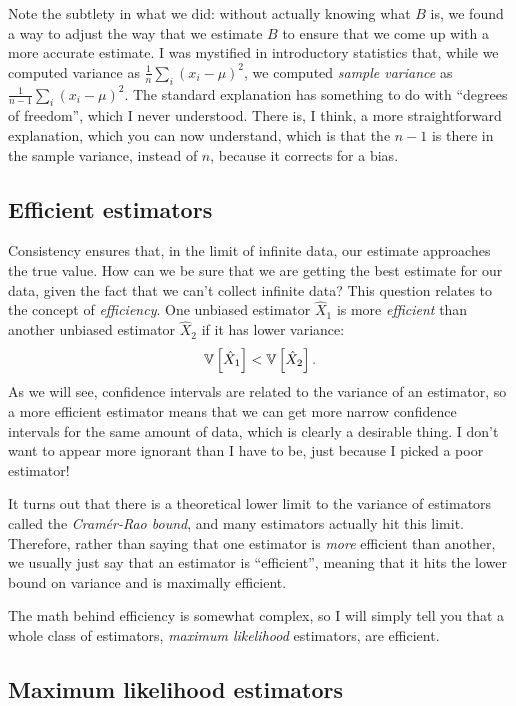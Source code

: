 Note the subtlety in what we did: without actually knowing what $B$ is, we found
a way to adjust the way that we estimate $B$ to ensure that we come up with a more
accurate estimate. I was mystified in introductory statistics that, while we computed
variance as $\tfrac{1}{n} \sum_i (x_i - \mu)^2$, we computed \emph{sample variance}
as $\tfrac{1}{n-1} \sum_i (x_i - \mu)^2$. The standard explanation has something to
do with ``degrees of freedom'', which I never understood. There is, I think, a
more straightforward explanation, which you can now understand, which is that the
$n-1$ is there in the sample variance, instead of $n$, because it corrects for a
bias.

\subsection{Efficient estimators}

Consistency ensures that, in the limit of infinite data, our estimate approaches
the true value. How can we be sure that we are getting the best estimate for our
data, given the fact that we can't collect infinite data? This question relates
to the concept of \emph{efficiency}. One unbiased estimator $\hat{X}_1$ is 
more \emph{efficient} than another
unbiased estimator $\hat{X}_2$ if it has lower variance:
\begin{equation*}
    \mathbb{V}\left[{\hat{X}_1}\right] < \mathbb{V}\left[{\hat{X}_2}\right].
\end{equation*}
As we will see, confidence intervals are related to the variance of an estimator,
so a more efficient estimator means that we can get more narrow confidence intervals
for the same amount of data, which is clearly a desirable thing. I don't want to
appear more ignorant than I have to be, just because I picked a poor estimator!

It turns out that there is a theoretical lower limit to the variance of estimators
called the \emph{Cram\'{e}r-Rao bound}, and many estimators actually hit this limit.
Therefore, rather than saying that one estimator is \emph{more} efficient than
another, we usually just say that an estimator is ``efficient'', meaning that it
hits the lower bound on variance and is maximally efficient.

The math behind efficiency is somewhat complex, so I will simply tell you that
a whole class of estimators, \emph{maximum likelihood} estimators, are efficient.

\subsection{Maximum likelihood estimators}

